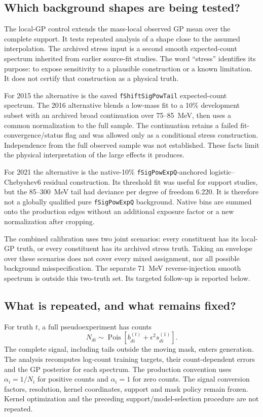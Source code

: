 \subsection{Which background shapes are being tested?}
\label{v5-sec:calibration-truths}
The local-GP control extends the mass-local observed GP mean over the
complete support. It tests repeated analysis of a shape close to the
assumed interpolation. The archived stress input is a second smooth
expected-count spectrum inherited from earlier source-fit studies. The
word ``stress'' identifies its purpose: to expose sensitivity to a plausible
construction or a known limitation. It does not certify that construction
as a physical truth.

For 2015 the alternative is the saved \texttt{fShiftSigPowTail}
expected-count spectrum. The 2016 alternative blends a low-mass fit to a
10\% development subset with an archived broad continuation over
75--85~MeV, then uses a common normalization to the full sample. The
continuation retains a failed fit-convergence/status flag and was allowed only as a
conditional stress construction. Independence from the full observed
sample was not established. These facts limit the physical interpretation
of the large effects it produces.

For 2021 the alternative is the native-10\%
\texttt{fSigPowExpQ}-anchored logistic--Chebyshev6 residual construction.
Its threshold fit was useful for support studies, but the 85--300~MeV
tail had deviance per degree of freedom 6.220. It is therefore not a
globally qualified pure \texttt{fSigPowExpQ} background. Native bins are
summed onto the production edges without an additional exposure factor
or a new normalization after cropping.

The combined calibration uses two joint scenarios: every constituent
has its local-GP truth, or every constituent has its archived stress truth.
Taking an envelope over these scenarios does not cover every mixed
assignment, nor all possible background misspecification. The separate
71~MeV reverse-injection smooth spectrum is outside this two-truth set.
Its targeted follow-up is reported below.

\subsection{What is repeated, and what remains fixed?}
For truth $t$, a full pseudoexperiment has counts
\begin{equation}
 N_{di}\sim\operatorname{Pois}\left[b^{(t)}_{di}
                  +\epsilon^2 s^{(1)}_{di}\right].
 \label{v5-eq:calibration-generation}
\end{equation}
The complete signal, including tails outside the moving mask, enters
generation. The analysis recomputes log-count training targets, their
count-dependent errors and the GP posterior for each spectrum. The
production convention uses $\alpha_i=1/N_i$ for positive counts and
$\alpha_i=1$ for zero counts. The signal conversion factors, resolution,
kernel coordinates, support and mask policy remain frozen. Kernel
optimization and the preceding support/model-selection procedure are
not repeated.

